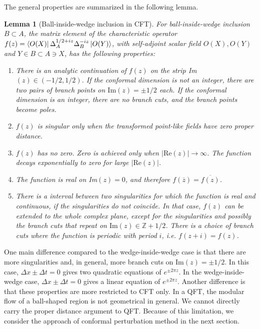 \documentclass[a4paper,11pt]{article}
\newtheorem{lemma}[theorem]{Lemma}
\theoremstyle{definition}
\begin{document}
The general properties are summarized in the following lemma.
\begin{lemma} [Ball-inside-wedge inclusion in CFT]
    For ball-inside-wedge inclusion $B\subset A$, the matrix element of the characteristic operator $f(z) = \bra{O(X)}\Delta_A^{1/2+iz}\Delta_B^{-iz}\ket{O(Y)}$, with self-adjoint scalar field $O(X), O(Y)$ and $Y\in B \subset A \ni X$, has the following properties:
    \begin{enumerate}
        \item There is an analytic continuation of $f(z)$ on the strip Im$(z)\in (-1/2,1/2)$. If the conformal dimension is not an integer, there are two pairs of branch points on $\text{Im}(z)=\pm1/2$ each. If the conformal dimension is an integer, there are no branch cuts, and the branch points become poles.
        \item $f(z)$ is singular only when the transformed point-like fields have zero proper distance.
        \item $f(z)$ has no zero. Zero is achieved only when $|\text{Re}(z)| \to \infty$. The function decays exponentially to zero for large $|\text{Re}(z)|$.
        \item The function is real on Im$(z) = 0$, and therefore $f(\overline{z}) = \overline{f(z)}$.
        \item There is a interval between two singularities for which the function is real and continuous, if the singularities do not coincide. In that case, $f(z)$ can be extended to the whole complex plane, except for the singularities and possibly the branch cuts that repeat on $\text{Im}(z) \in \mathbb{Z} +1/2$. There is a choice of branch cuts where the function is periodic with period $i$, i.e. $f(z+i)=f(z)$. 
    \end{enumerate}
\end{lemma}
One main difference compared to the wedge-inside-wedge case is that there are more singularities and, in general, more branch cuts on $\text{Im}(z) = \pm 1/2$. In this case, $\Delta x \pm \Delta t = 0$ gives two quadratic equations of $e^{\pm 2\pi z}$. In the wedge-inside-wedge case, $\Delta x \pm \Delta t = 0$ gives a linear equation of $e^{\pm2\pi z}$. Another difference is that these properties are more restricted to CFT only. In a QFT, the modular flow of a ball-shaped region is not geometrical in general. We cannot directly carry the proper distance argument to QFT. Because of this limitation, we consider the approach of conformal perturbation method in the next section.
\end{document}
